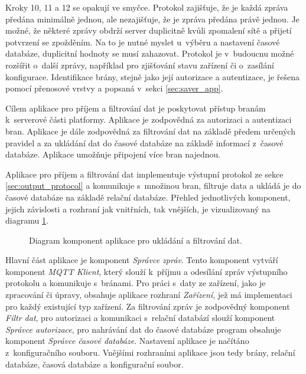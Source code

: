 Kroky 10, 11 a 12 se opakují ve smyčce. Protokol zajišťuje, že je každá zpráva předána minimálně jednou, ale nezajišťuje, že je zpráva předána právě jednou. Je možné, že některé zprávy obdrží server duplicitně kvůli zpomalení sítě a přijetí potvrzení se zpožděním. Na to je nutné myslet u~výběru a nastavení časové databáze, duplicitní hodnoty se musí zahazovat. Protokol je v~budoucnu možné rozšířit o~další zprávy, například pro zjišťování stavu zařízení či o~zasílání konfigurace. Identifikace brány, stejně jako její autorizace a autentizace, je řešena pomocí přenosové vrstvy a popsaná v~sekci \ref{sec:saver_app}.

\label{sec:saver_app}
Cílem aplikace pro příjem a filtrování dat je poskytovat přístup branám k~serverové části platformy. Aplikace je zodpovědná za autorizaci a autentizaci bran. Aplikace je dále zodpovědná za filtrování dat na základě předem určených pravidel a za ukládání dat do časové databáze na základě informací z~časové databáze. Aplikace umožňuje připojení více bran najednou.

Aplikace pro příjem a filtrování dat implementuje výstupní protokol ze sekce \ref{sec:output_protocol} a komunikuje s~množinou bran, filtruje data a ukládá je do časové databáze na základě relační databáze. Přehled jednotlivých komponent, jejich závislosti a rozhraní jak vnitřních, tak vnějších, je vizualizovaný na diagramu \ref{dia:uploader_architecture}.

\begin{figure}[ht]
  \centering
  
  \caption{Diagram komponent aplikace pro ukládání a filtrování dat.}
  \label{dia:uploader_architecture}
\end{figure}

Hlavní část aplikace je komponent \textit{Správce zpráv}. Tento komponent vytváří komponent \textit{MQTT Klient}, který slouží k~příjmu a odesílání zpráv výstupního protokolu a komunikuje s~bránami. Pro práci s~daty ze zařízení, jako je zpracování či úpravy, obsahuje aplikace rozhraní \textit{Zařízení}, jež má implementaci pro každý existující typ zařízení. Za filtrování zpráv je zodpovědný komponent \textit{Filtr dat}, pro autorizaci a komunikaci s~relační databází slouží komponent \textit{Správce autorizace}, pro nahrávání dat do časové databáze program obsahuje komponent \textit{Správce časové databáze}. Nastavení aplikace je načítáno z~konfiguračního souboru. Vnějšími rozhraními aplikace jsou tedy brány, relační databáze, časová databáze a konfigurační soubor.

